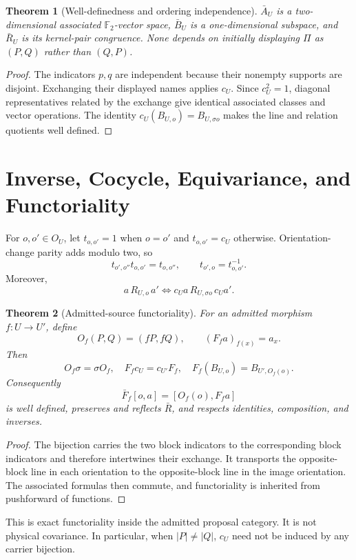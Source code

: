 \documentclass[11pt]{article}
\newtheorem{theorem}{Theorem}
\newcommand{\Ftwo}{\mathbb F_2}
\begin{document}
\begin{theorem}[Well-definedness and ordering independence]
\(\bar A_U\) is a two-dimensional associated \(\Ftwo\)-vector space,
\(\bar B_U\) is a one-dimensional subspace, and \(\bar R_U\) is its
kernel-pair congruence. None depends on initially displaying \(\Pi\) as
\((P,Q)\) rather than \((Q,P)\).
\end{theorem}

\begin{proof}
The indicators \(p,q\) are independent because their nonempty supports are
disjoint. Exchanging their displayed names applies \(c_U\). Since
\(c_U^2=1\), diagonal representatives related by the exchange give identical
associated classes and vector operations. The identity
\(c_U(B_{U,o})=B_{U,\sigma o}\) makes the line and relation quotients
well defined.
\end{proof}

\section{Inverse, Cocycle, Equivariance, and Functoriality}

For \(o,o'\in O_U\), let \(t_{o,o'}=1\) when \(o=o'\) and
\(t_{o,o'}=c_U\) otherwise. Orientation-change parity adds modulo two, so
\[
t_{o',o''}t_{o,o'}=t_{o,o''},\qquad
t_{o',o}=t_{o,o'}^{-1}.
\]
Moreover,
\[
a\,R_{U,o}\,a'
\Longleftrightarrow
c_Ua\,R_{U,\sigma o}\,c_Ua'.
\]

\begin{theorem}[Admitted-source functoriality]
For an admitted morphism \(f:U\to U'\), define
\[
O_f(P,Q)=(fP,fQ),\qquad
(F_fa)_{f(x)}=a_x.
\]
Then
\[
O_f\sigma=\sigma O_f,\quad
F_fc_U=c_{U'}F_f,\quad
F_f(B_{U,o})=B_{U',O_f(o)}.
\]
Consequently
\[
\bar F_f[o,a]=[O_f(o),F_fa]
\]
is well defined, preserves and reflects \(\bar R\), and respects identities,
composition, and inverses.
\end{theorem}

\begin{proof}
The bijection carries the two block indicators to the corresponding block
indicators and therefore intertwines their exchange. It transports the
opposite-block line in each orientation to the opposite-block line in the
image orientation. The associated formulas then commute, and functoriality
is inherited from pushforward of functions.
\end{proof}

This is exact functoriality inside the admitted proposal category. It is not
physical covariance. In particular, when \(|P|\neq|Q|\), \(c_U\) need not be
induced by any carrier bijection.
\end{document}
